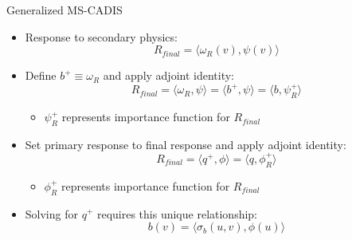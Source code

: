 \documentclass{beamer}
\begin{document}
\begin{frame}{Generalized MS-CADIS}
\begin{itemize}
\item{Response to secondary physics:}
\begin{equation} \label{eq:response}
  R_{final} = \langle \omega_R(v), \psi(v) \rangle
\end{equation}
\pause
\item{Define  $b^+ \equiv \omega_R$ and apply adjoint
	identity:}
\begin{equation}
  R_{final} = \langle \omega_R, \psi \rangle 
	= \langle b^+, \psi \rangle
	= \langle b, \psi_R^{+}\rangle
\end{equation}
		\vspace{-0.4cm}          
		\begin{itemize}
		\item{$\psi_R^+$ represents importance function for $R_{final}$}
		\end{itemize}
		\vspace{0.4cm}         
\pause
\item{Set primary response to final response and apply adjoint
	identity:}
	\begin{equation}
		R_{final} = \langle q^+, \phi \rangle
		          = \langle q, \phi_R^+ \rangle
	\end{equation}
		\vspace{-0.4cm}          
		\begin{itemize}
		\item{$\phi_R^+$ represents importance function for $R_{final}$}
		\end{itemize}
		\vspace{0.4cm}         
\pause
\item{Solving for $q^+$ requires this unique relationship:}
          \begin{equation}\label{eq:coupling}
            b(v) = \langle \sigma_b(u,v), \phi(u) \rangle
          \end{equation}


\end{itemize}
\end{frame}
\end{document}

